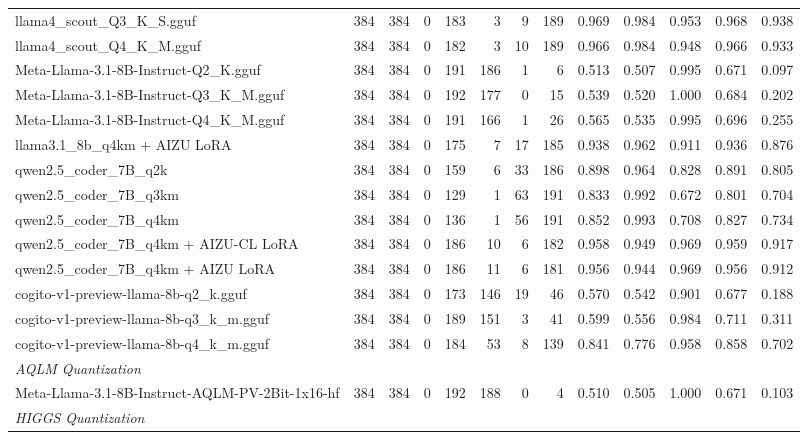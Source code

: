 \begin{table}[htbp]
{\begin{tabular}{lrrrrrrrrrrrr}
    llama4\_scout\_Q3\_K\_S.gguf & 384 & 384 & 0 & 183 & 3 & 9 & 189 & 0.969 & 0.984 & 0.953 & 0.968 & \cellcolor{green!30}0.938 \\
    llama4\_scout\_Q4\_K\_M.gguf & 384 & 384 & 0 & 182 & 3 & 10 & 189 & 0.966 & 0.984 & 0.948 & 0.966 & \cellcolor{green!20}0.933 \\
    Meta-Llama-3.1-8B-Instruct-Q2\_K.gguf & 384 & 384 & 0 & 191 & 186 & 1 & 6 & 0.513 & 0.507 & 0.995 & 0.671 & 0.097 \\
    Meta-Llama-3.1-8B-Instruct-Q3\_K\_M.gguf & 384 & 384 & 0 & 192 & 177 & 0 & 15 & 0.539 & 0.520 & 1.000 & 0.684 & 0.202 \\
    Meta-Llama-3.1-8B-Instruct-Q4\_K\_M.gguf & 384 & 384 & 0 & 191 & 166 & 1 & 26 & 0.565 & 0.535 & 0.995 & 0.696 & 0.255 \\
    llama3.1\_8b\_q4km + AIZU LoRA & 384 & 384 & 0 & 175 & 7 & 17 & 185 & 0.938 & 0.962 & 0.911 & 0.936 & 0.876 \\
    qwen2.5\_coder\_7B\_q2k & 384 & 384 & 0 & 159 & 6 & 33 & 186 & 0.898 & 0.964 & 0.828 & 0.891 & 0.805 \\
    qwen2.5\_coder\_7B\_q3km & 384 & 384 & 0 & 129 & 1 & 63 & 191 & 0.833 & 0.992 & 0.672 & 0.801 & 0.704 \\
    qwen2.5\_coder\_7B\_q4km & 384 & 384 & 0 & 136 & 1 & 56 & 191 & 0.852 & 0.993 & 0.708 & 0.827 & 0.734 \\
    qwen2.5\_coder\_7B\_q4km + AIZU-CL LoRA & 384 & 384 & 0 & 186 & 10 & 6 & 182 & 0.958 & 0.949 & 0.969 & 0.959 & \cellcolor{green!10}0.917 \\
    qwen2.5\_coder\_7B\_q4km + AIZU LoRA & 384 & 384 & 0 & 186 & 11 & 6 & 181 & 0.956 & 0.944 & 0.969 & 0.956 & 0.912 \\
    cogito-v1-preview-llama-8b-q2\_k.gguf & 384 & 384 & 0 & 173 & 146 & 19 & 46 & 0.570 & 0.542 & 0.901 & 0.677 & 0.188 \\
    cogito-v1-preview-llama-8b-q3\_k\_m.gguf & 384 & 384 & 0 & 189 & 151 & 3 & 41 & 0.599 & 0.556 & 0.984 & 0.711 & 0.311 \\
    cogito-v1-preview-llama-8b-q4\_k\_m.gguf & 384 & 384 & 0 & 184 & 53 & 8 & 139 & 0.841 & 0.776 & 0.958 & 0.858 & 0.702 \\
    \midrule
    \multicolumn{13}{l}{\textit{AQLM Quantization}} \\
    \midrule
    Meta-Llama-3.1-8B-Instruct-AQLM-PV-2Bit-1x16-hf & 384 & 384 & 0 & 192 & 188 & 0 & 4 & 0.510 & 0.505 & 1.000 & 0.671 & 0.103 \\
    \midrule
    \multicolumn{13}{l}{\textit{HIGGS Quantization}} \\

\end{tabular}}
\end{table}
